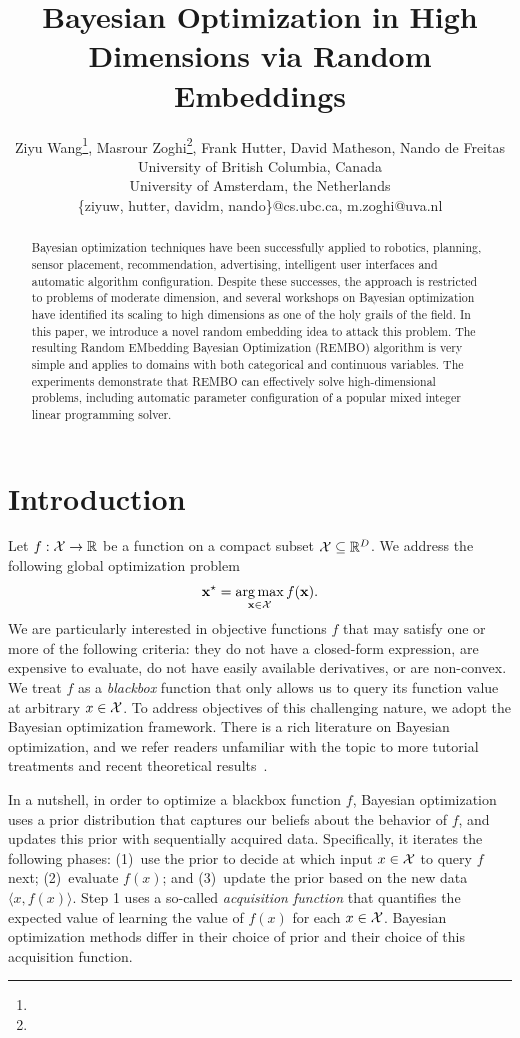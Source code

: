 \documentclass{article}
\title{Bayesian Optimization in High Dimensions via Random Embeddings}
\author{Ziyu Wang\footnote{},
Masrour Zoghi\footnote{},
Frank Hutter\samethanks[1],
David Matheson\samethanks[1],
Nando de Freitas\samethanks[1]\\
\samethanks[1]University of British Columbia, Canada \\
\samethanks[2]University of Amsterdam, the Netherlands\\
\samethanks[1]\{ziyuw, hutter, davidm, nando\}@cs.ubc.ca, \samethanks[2]m.zoghi@uva.nl}
\DeclareMathOperator*{\argmax}{arg\,max}
\begin{document}
\maketitle

\begin{abstract}
  Bayesian optimization techniques have been successfully applied to robotics, planning, sensor placement, recommendation, advertising, intelligent user interfaces and automatic algorithm configuration. Despite these successes, the approach is restricted to problems of moderate dimension, and several 
workshops on Bayesian optimization have identified its scaling to high dimensions as one of the holy grails of the field. 
In this paper, we introduce a novel random embedding idea to attack this problem.
The resulting Random EMbedding Bayesian Optimization (REMBO) algorithm is very simple
and applies to domains with both categorical and continuous variables. 
The experiments demonstrate that REMBO can effectively solve high-dimensional problems, including automatic parameter configuration of a popular
mixed integer linear programming solver.

\end{abstract}




\section{Introduction}
\label{sec:introduction}
Let $f: {\cal X} \to \mathbb{R}$ be a function on a compact subset ${\cal X} \subseteq \mathbb{R}^D$. We address the following global optimization problem
\[ \vx^{\star} = \argmax_{\vx \in {\cal X}} f(\vx). \]
We are particularly interested in objective functions $f$ that may satisfy one or more of the following criteria: they do not have a closed-form expression, are expensive to evaluate, do not have easily available derivatives, or are non-convex. We treat $f$ as a \emph{blackbox} function that only allows us to query its function value at arbitrary $x\in \cal{X}$.
To address objectives of this challenging nature, we adopt the Bayesian optimization framework. 
There is a rich literature on Bayesian optimization, and we refer readers unfamiliar with the topic to more tutorial treatments \cite{Brochu:2009,Jones:1998,Jones:2001,Lizotte:2011,Mockus:1994,Osborne:2009} and recent theoretical results~\cite{Srinivas:2010,deFreitas:2012}. 

In a nutshell, in order to optimize a blackbox function $f$, Bayesian optimization uses a prior distribution that captures our beliefs about the behavior of $f$,
and updates this prior with sequentially acquired data.
Specifically, it iterates the following phases:
(1)~use the prior to decide at which input $x\in \cal X$ to query $f$ next; 
(2)~evaluate $f(x)$; and (3)~update the prior based on the new data $\langle{}x, f(x)\rangle$.
Step 1 uses a so-called \emph{acquisition function} that quantifies the expected value of learning the value of $f(x)$ for each $x \in \cal X$.
Bayesian optimization methods differ in their choice of prior and their choice of this acquisition function.
\end{document}
